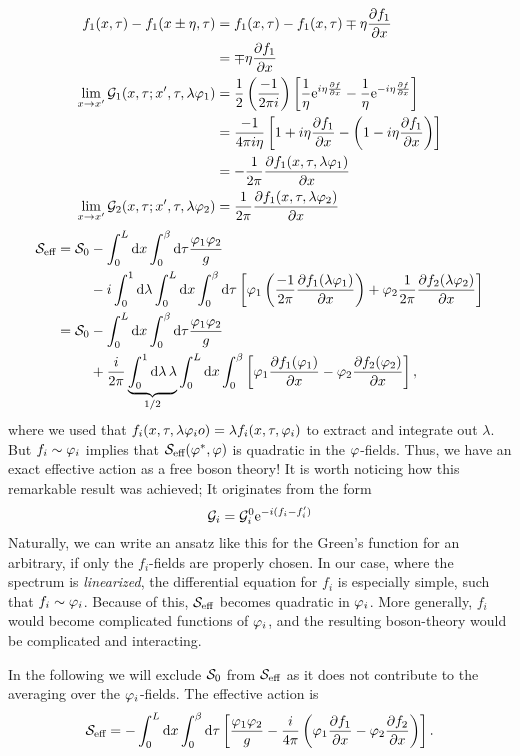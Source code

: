 \begin{align*}
f_1(x,\tau) - f_1(x\pm\eta,\tau) &= f_1(x,\tau) - f_1(x,\tau) \mp\eta\pdv{f_1}{x} \\
&= \mp\eta\pdv{f_1}{x} \\
\lim\limits_{x\rightarrow x'}\mathcal{G}_1(x,\tau;x',\tau,\lambda\varphi_1) &= \frac{1}{2}\left(\frac{-1}{2\pi i}\right)\left[\frac{1}{\eta}\mathrm{e}^{i\eta\pdv{f}{x}} - \frac{1}{\eta}\mathrm{e}^{-i\eta\pdv{f}{x}}\right] \\
&= \frac{-1}{4\pi i\eta}\left[1+i\eta\pdv{f_1}{x} - \left(1-i\eta\pdv{f_1}{x}\right)\right] \\
&= -\frac{1}{2\pi}\pdv{f_1(x,\tau,\lambda\varphi_1)}{x} \\
\lim\limits_{x\rightarrow x'}\mathcal{G}_2(x,\tau;x',\tau,\lambda\varphi_2) &= \frac{1}{2\pi}\pdv{f_1(x,\tau,\lambda\varphi_2)}{x}
\end{align*}
\begin{align*}
\Sa_{\text{eff}} = \Sa_0 &- \int_0^L\dx\int_0^\beta\dd\tau\frac{\p_1\p_2}{g}\\&-i\int_0^1\dd\lambda\int_0^L\dx\int_0^\beta\dd\tau\left[\p_1\left(\frac{-1}{2\pi}\pdv{f_1(\lambda\p_1)}{x}\right) + \p_2\frac{1}{2\pi}\pdv{f_2(\lambda\p_2)}{x}\right] \\
=\Sa_0 &- \int_0^L\dx\int_0^\beta\dd\tau\frac{\p_1\p_2}{g}\\
&+\frac{i}{2\pi}\underbrace{\int_0^1\dd\lambda\,\lambda}_{\flatfrac{1}2}\int_0^L\dx\int_0^\beta\left[\p_1\pdv{f_1(\p_1)}{x} -\p_2\pdv{f_2(\p_2)}{x}\right],
\end{align*}
where we used that \(f_i(x, \tau, \lambda\varphi_io) = \lambda f_i(x, \tau, \varphi_i)\) to extract and integrate out $\lambda$.
But \(f_i\sim\varphi_i\) implies that \( \mathcal{S}_{\text{eff}}(\varphi^*,\varphi)\) is quadratic in the $\varphi$-fields. Thus, we have an exact effective action as a free boson theory!
It is worth noticing how this remarkable result was achieved; It originates from the form \[\mathcal{G}_i=\mathcal{G}_i^0\mathrm{e}^{-i(f_i-f_i')}\]
Naturally, we can write an ansatz like this for the Green's function for an arbitrary, if only the $f_i$-fields are properly chosen. In our case, where the spectrum is \textit{linearized}, the differential equation for $f_i$ is especially simple, such that $f_i \sim\varphi_i$. Because of this, $\mathcal{S}_{\text{eff}}$ becomes quadratic in $\varphi_i$. More generally, $f_i$ would become complicated functions of $\varphi_i$, and the resulting boson-theory would be complicated and interacting. 

In the following we will exclude \(\mathcal{S}_{0}\) from \(\mathcal{S}_{\text{eff}}\) as it does not contribute to the averaging over the $\varphi_i$-fields. The effective action is
\begin{equation}
\label{eq:1d_effective_action}
\mathcal{S}_{\text{eff}} = -\int_0^L\dd{x}\int_0^\beta\dd{\tau}\left[\frac{\varphi_1\varphi_2}{g} - \frac{i}{4\pi}\left(\varphi_1\pdv{f_1}{x}-\varphi_2\pdv{f_2}{x}\right)\right].
\end{equation}

